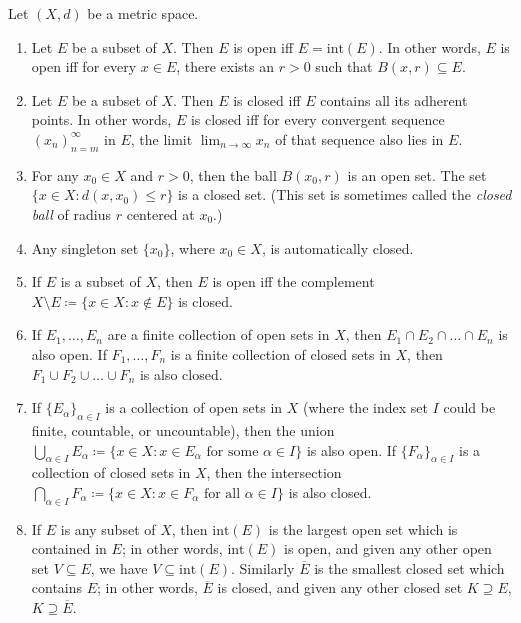 \begin{prop}\label{1.2.15}
  Let \((X, d)\) be a metric space.
  \begin{enumerate}
    \item Let \(E\) be a subset of \(X\).
          Then \(E\) is open iff \(E = \text{int}(E)\).
          In other words, \(E\) is open iff for every \(x \in E\), there exists an \(r > 0\) such that \(B(x, r) \subseteq E\).
    \item Let \(E\) be a subset of \(X\).
          Then \(E\) is closed iff \(E\) contains all its adherent points.
          In other words, \(E\) is closed iff for every convergent sequence \((x_n)_{n = m}^\infty\) in \(E\), the limit \(\lim_{n \to \infty} x_n\) of that sequence also lies in \(E\).
    \item For any \(x_0 \in X\) and \(r > 0\), then the ball \(B(x_0, r)\) is an open set.
          The set \(\{x \in X : d(x, x_0) \leq r\}\) is a closed set.
          (This set is sometimes called the \emph{closed ball} of radius \(r\) centered at \(x_0\).)
    \item Any singleton set \(\{x_0\}\), where \(x_0 \in X\), is automatically closed.
    \item If \(E\) is a subset of \(X\), then \(E\) is open iff the complement \(X \setminus E \coloneqq \{x \in X : x \notin E\}\) is closed.
    \item If \(E_1, \dots, E_n\) are a finite collection of open sets in \(X\), then \(E_1 \cap E_2 \cap \dots \cap E_n\) is also open.
          If \(F_1, \dots, F_n\) is a finite collection of closed sets in \(X\), then \(F_1 \cup F_2 \cup \dots \cup F_n\) is also closed.
    \item If \(\{E_\alpha\}_{\alpha \in I}\) is a collection of open sets in \(X\) (where the index set \(I\) could be finite, countable, or uncountable), then the union \(\bigcup_{\alpha \in I} E_\alpha \coloneqq \{x \in X : x \in E_\alpha \text{ for some } \alpha \in I\}\) is also open.
          If \(\{F_\alpha\}_{\alpha \in I}\) is a collection of closed sets in \(X\), then the intersection \(\bigcap_{\alpha \in I} F_\alpha \coloneqq \{x \in X : x \in F_\alpha \text{ for all } \alpha \in I\}\) is also closed.
    \item If \(E\) is any subset of \(X\), then \(\text{int}(E)\) is the largest open set which is contained in \(E\);
          in other words, \(\text{int}(E)\) is open, and given any other open set \(V \subseteq E\), we have \(V \subseteq \text{int}(E)\).
          Similarly \(\overline{E}\) is the smallest closed set which contains \(E\);
          in other words, \(\overline{E}\) is closed, and given any other closed set \(K \supseteq E\), \(K \supseteq \overline{E}\).
  \end{enumerate}
\end{prop}

